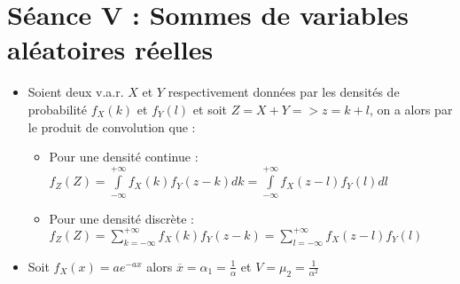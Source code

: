 \documentclass[a4paper,11pt]{report}
\begin{document}
\section{Séance V : Sommes de variables aléatoires réelles}
\begin{itemize}
	\item Soient deux v.a.r. $X$ et $Y$ respectivement données par les densités de probabilité $f_X(k)$ et $f_Y(l)$ et soit $Z = X+Y => z = k+l$, on a alors par le produit de convolution que :
	\begin{itemize}
		\item Pour une densité continue :\\
		$f_Z(Z) = \int\limits_{-\infty}^{+\infty}{f_X(k)f_Y(z-k)dk} = \int\limits_{-\infty}^{+\infty}{f_X(z-l)f_Y(l)dl}$
		\item Pour une densité discrète :\\
		$f_Z(Z) = \sum\limits_{k=-\infty}^{+\infty}{f_X(k)f_Y(z-k)} = \sum\limits_{l=-\infty}^{+\infty}{f_X(z-l)f_Y(l)}$
	\end{itemize}
	\item Soit $f_X(x) = ae^{-ax}$ alors $\overline{x} = \alpha_1 = \frac{1}{\alpha}$ et $V = \mu_2 = \frac{1}{\alpha^2}$
\end{itemize}

\newpage
\end{document}
